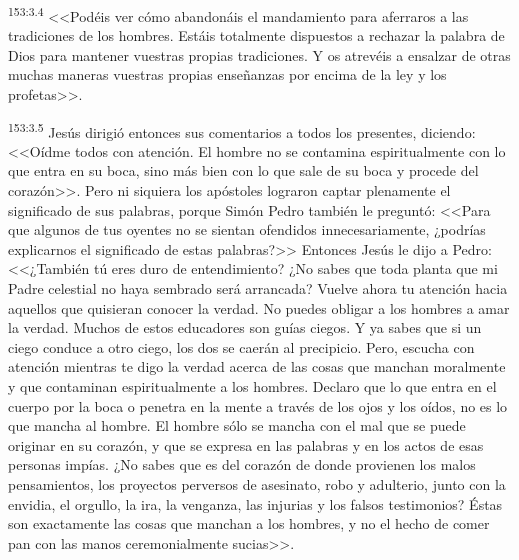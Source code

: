 \par 
\textsuperscript{153:3.4} <<Podéis ver cómo abandonáis el mandamiento para aferraros a las tradiciones de los hombres. Estáis totalmente dispuestos a rechazar la palabra de Dios para mantener vuestras propias tradiciones. Y os atrevéis a ensalzar de otras muchas maneras vuestras propias enseñanzas por encima de la ley y los profetas>>.

\par 
\textsuperscript{153:3.5} Jesús dirigió entonces sus comentarios a todos los presentes, diciendo: <<Oídme todos con atención. El hombre no se contamina espiritualmente con lo que entra en su boca, sino más bien con lo que sale de su boca y procede del corazón>>. Pero ni siquiera los apóstoles lograron captar plenamente el significado de sus palabras, porque Simón Pedro también le preguntó: <<Para que algunos de tus oyentes no se sientan ofendidos innecesariamente, ¿podrías explicarnos el significado de estas palabras?>> Entonces Jesús le dijo a Pedro: <<¿También tú eres duro de entendimiento? ¿No sabes que toda planta que mi Padre celestial no haya sembrado será arrancada? Vuelve ahora tu atención hacia aquellos que quisieran conocer la verdad. No puedes obligar a los hombres a amar la verdad. Muchos de estos educadores son guías ciegos. Y ya sabes que si un ciego conduce a otro ciego, los dos se caerán al precipicio. Pero, escucha con atención mientras te digo la verdad acerca de las cosas que manchan moralmente y que contaminan espiritualmente a los hombres. Declaro que lo que entra en el cuerpo por la boca o penetra en la mente a través de los ojos y los oídos, no es lo que mancha al hombre. El hombre sólo se mancha con el mal que se puede originar en su corazón, y que se expresa en las palabras y en los actos de esas personas impías. ¿No sabes que es del corazón de donde provienen los malos pensamientos, los proyectos perversos de asesinato, robo y adulterio, junto con la envidia, el orgullo, la ira, la venganza, las injurias y los falsos testimonios? Éstas son exactamente las cosas que manchan a los hombres, y no el hecho de comer pan con las manos ceremonialmente sucias>>.

